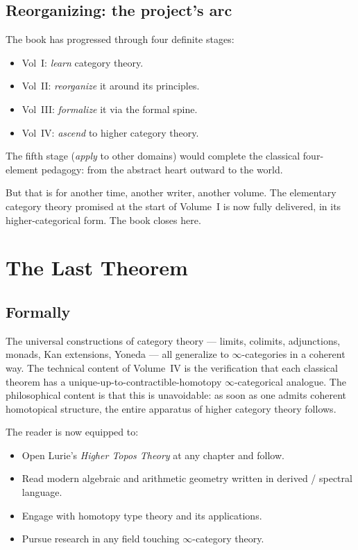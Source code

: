 \subsection{Reorganizing: the project's arc}

\begin{remark}
The book has progressed through four definite stages:
\begin{itemize}
  \item Vol~I: \emph{learn} category theory.
  \item Vol~II: \emph{reorganize} it around its principles.
  \item Vol~III: \emph{formalize} it via the formal spine.
  \item Vol~IV: \emph{ascend} to higher category theory.
\end{itemize}
The fifth stage (\emph{apply} to other domains) would complete the
classical four-element pedagogy: from the abstract heart outward to
the world.

But that is for another time, another writer, another volume. The
elementary category theory promised at the start of Volume~I is now
fully delivered, in its higher-categorical form. The book closes here.
\end{remark}


\section{The Last Theorem}
\label{sec:last-theorem}

\subsection{Formally}

\begin{remark}
The universal constructions of category theory — limits, colimits,
adjunctions, monads, Kan extensions, Yoneda — all generalize to
$\infty$-categories in a coherent way. The technical content of
Volume~IV is the verification that each classical theorem has a
unique-up-to-contractible-homotopy $\infty$-categorical analogue.
The philosophical content is that this is unavoidable: as soon as one
admits coherent homotopical structure, the entire apparatus of higher
category theory follows.

The reader is now equipped to:
\begin{itemize}
  \item Open Lurie's \emph{Higher Topos Theory} at any chapter and follow.
  \item Read modern algebraic and arithmetic geometry written in derived
        / spectral language.
  \item Engage with homotopy type theory and its applications.
  \item Pursue research in any field touching $\infty$-category theory.
\end{itemize}
\end{remark}


